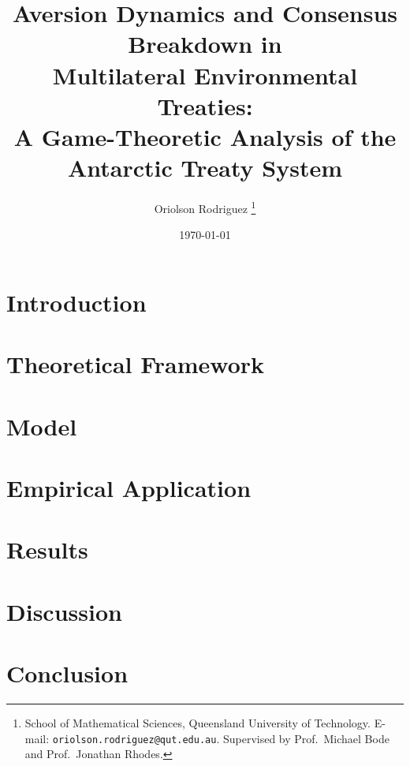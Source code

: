 \documentclass[12pt,a4paper]{article}
\title{Aversion Dynamics and Consensus Breakdown in\\
       Multilateral Environmental Treaties:\\
       A Game-Theoretic Analysis of the Antarctic Treaty System}
\author{Oriolson Rodriguez%
  \thanks{School of Mathematical Sciences, Queensland University of Technology.
          E-mail: \texttt{oriolson.rodriguez@qut.edu.au}.
          Supervised by Prof.\ Michael Bode and Prof.\ Jonathan Rhodes.}}
\date{\today}
\theoremstyle{plain}
\theoremstyle{definition}
\begin{document}
\maketitle

\begin{abstract}
\end{abstract}

\section{Introduction}
\label{sec:intro}


\section{Theoretical Framework}
\label{sec:theory}


\section{Model}
\label{sec:model}


\section{Empirical Application}
\label{sec:empirical}


\section{Results}
\label{sec:results}


\section{Discussion}
\label{sec:discussion}


\section{Conclusion}
\label{sec:conclusion}


\printbibliography
\end{document}
